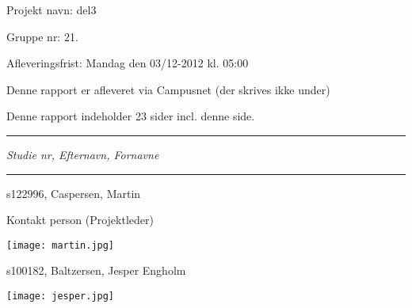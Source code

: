 
{\normalsize

\noindent Projekt navn: del3

\noindent Gruppe nr: 21.

\noindent Afleveringsfrist: Mandag den 03/12-2012 kl. 05:00

\noindent Denne rapport er afleveret via Campusnet (der skrives ikke under)

\noindent Denne rapport indeholder 23 sider incl. denne side.
}
\fancybreak{}
\noindent \emph{Studie nr, Efternavn, Fornavne}
\fancybreak{}

\noindent s122996, Caspersen, Martin

\noindent Kontakt person (Projektleder)

\noindent \texttt{[image: martin.jpg]}

\noindent s100182, Baltzersen, Jesper Engholm

\noindent \texttt{[image: jesper.jpg]}